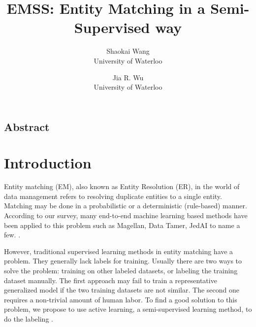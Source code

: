 \documentclass[letterpaper,twocolumn,10pt]{article}
\begin{document}
\date{}

\title{\Large \bf EMSS: Entity Matching in a Semi-Supervised way}




\author{
{\rm Shaokai Wang}\\
University of Waterloo
\and
{\rm Jia R. Wu}\\
University of Waterloo
} %

\maketitle

\thispagestyle{empty}


\subsection*{Abstract}



\section{Introduction}
Entity matching (EM), also known as Entity Resolution (ER), in the world of data management refers to resolving duplicate entities to a single entity. Matching may be done in a probabilistic or a deterministic (rule-based) manner. According to our survey, many end-to-end machine learning based methods have been applied to this problem such as Magellan, Data Tamer, JedAI to name a few. \cite{konda2016magellan, stonebraker2013data, papadakis2018jedai}.

However, traditional supervised learning methods in entity matching have a problem. They generally lack labels for training. Usually there are two ways to solve the problem: training on other labeled datasets, or labeling the training dataset manually. The first approach may fail to train a representative generalized model if the two training datasets are not similar. The second one requires a non-trivial amount of human labor. To find a good solution to this problem, we propose to use active learning, a semi-supervised learning method, to do the labeling \cite{settles2009active}.
\end{document}
